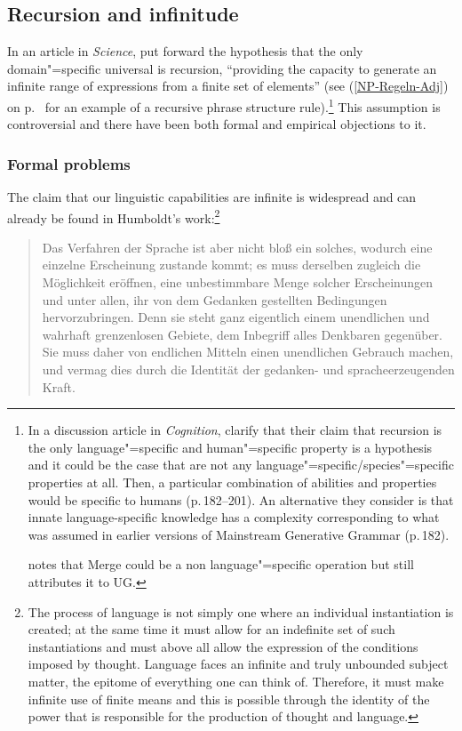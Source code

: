 \subsection{Recursion and infinitude}
\label{Abschnitt-Rekursion}

In an article in \emph{Science}, \citet*{HCF2002a} put forward the hypothesis that the only
domain"=specific universal is recursion, ``providing the capacity to generate an infinite range of expressions from a finite set of elements'' (see (\ref{NP-Regeln-Adj}) on p.~\pageref{NP-Regeln-Adj} for an example of a
recursive phrase structure rule).\footnote{
	In a discussion article in \emph{Cognition}, \citet*{FHC2005a} clarify that their claim that recursion is the only language"=specific and
	human"=specific property is a hypothesis and it could be the case that are not any language"=specific/species"=specific properties at all.
	Then, a particular combination of abilities and properties would be specific to humans
        (p.\,182--201). An alternative they consider is that innate language-specific knowledge has a complexity corresponding to what was assumed in earlier versions of Mainstream Generative Grammar (p.\,182).

\citet[]{Chomsky2007a} notes that Merge could be a non language"=specific operation but still attributes it to UG.%
} This assumption is controversial and there have been both formal and empirical objections to it.

\subsubsection{Formal problems}

The claim that our linguistic capabilities are infinite is widespread and can already be found
in Humboldt's work:\footnote{
The process of language is not simply one where an individual instantiation is created; at the same time it must allow for an
indefinite set of such instantiations and must above all allow the expression of the conditions imposed by thought.
Language faces an infinite and truly unbounded subject matter, the epitome of everything one can think of. Therefore, it must make
infinite use of finite means and this is possible through the identity of the power that is
responsible for the production of thought and language.
}
\begin{quote}
Das Verfahren der Sprache ist aber nicht bloß ein solches, wodurch eine einzelne Erscheinung zustande kommt;
es muss derselben zugleich die Möglichkeit eröffnen, eine unbestimmbare Menge solcher Erscheinungen und unter allen,
ihr von dem Gedanken gestellten Bedingungen hervorzubringen.
Denn sie steht ganz eigentlich einem unendlichen und wahrhaft grenzenlosen Gebiete, dem Inbegriff alles
Denk\-baren gegenüber. Sie muss daher von endlichen Mitteln einen unendlichen Gebrauch machen, und
vermag dies durch die Identität der gedanken- und sprache\-erzeugenden Kraft.  \citep[]{Humboldt88a-u}
\end{quote}


